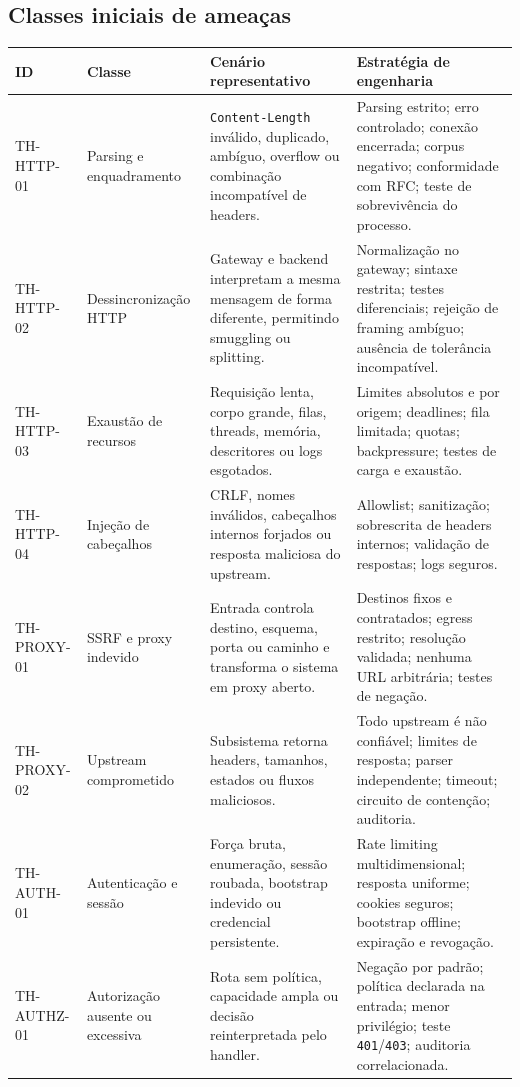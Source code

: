 \documentclass[11pt,a4paper,oneside]{article}
\renewcommand{\arraystretch}{1.18}
\begin{document}
\subsection{Classes iniciais de ameaças}
\begin{landscape}
\begingroup
\tiny
\renewcommand{\arraystretch}{1.02}
\begin{longtable}{P{2.2cm}P{3.2cm}P{6.5cm}P{7.7cm}}
\toprule
\textbf{ID} & \textbf{Classe} & \textbf{Cenário representativo} & \textbf{Estratégia de engenharia} \\
\midrule
\endhead
TH-HTTP-01 & Parsing e enquadramento & \texttt{Content-Length} inválido, duplicado, ambíguo, overflow ou combinação incompatível de headers. & Parsing estrito; erro controlado; conexão encerrada; corpus negativo; conformidade com RFC; teste de sobrevivência do processo. \\
TH-HTTP-02 & Dessincronização HTTP & Gateway e backend interpretam a mesma mensagem de forma diferente, permitindo smuggling ou splitting. & Normalização no gateway; sintaxe restrita; testes diferenciais; rejeição de framing ambíguo; ausência de tolerância incompatível. \\
TH-HTTP-03 & Exaustão de recursos & Requisição lenta, corpo grande, filas, threads, memória, descritores ou logs esgotados. & Limites absolutos e por origem; deadlines; fila limitada; quotas; backpressure; testes de carga e exaustão. \\
TH-HTTP-04 & Injeção de cabeçalhos & CRLF, nomes inválidos, cabeçalhos internos forjados ou resposta maliciosa do upstream. & Allowlist; sanitização; sobrescrita de headers internos; validação de respostas; logs seguros. \\
TH-PROXY-01 & SSRF e proxy indevido & Entrada controla destino, esquema, porta ou caminho e transforma o sistema em proxy aberto. & Destinos fixos e contratados; egress restrito; resolução validada; nenhuma URL arbitrária; testes de negação. \\
TH-PROXY-02 & Upstream comprometido & Subsistema retorna headers, tamanhos, estados ou fluxos maliciosos. & Todo upstream é não confiável; limites de resposta; parser independente; timeout; circuito de contenção; auditoria. \\
TH-AUTH-01 & Autenticação e sessão & Força bruta, enumeração, sessão roubada, bootstrap indevido ou credencial persistente. & Rate limiting multidimensional; resposta uniforme; cookies seguros; bootstrap offline; expiração e revogação. \\
TH-AUTHZ-01 & Autorização ausente ou excessiva & Rota sem política, capacidade ampla ou decisão reinterpretada pelo handler. & Negação por padrão; política declarada na entrada; menor privilégio; teste \texttt{401}/\texttt{403}; auditoria correlacionada. \\

\end{longtable}
\end{landscape}
\end{document}
